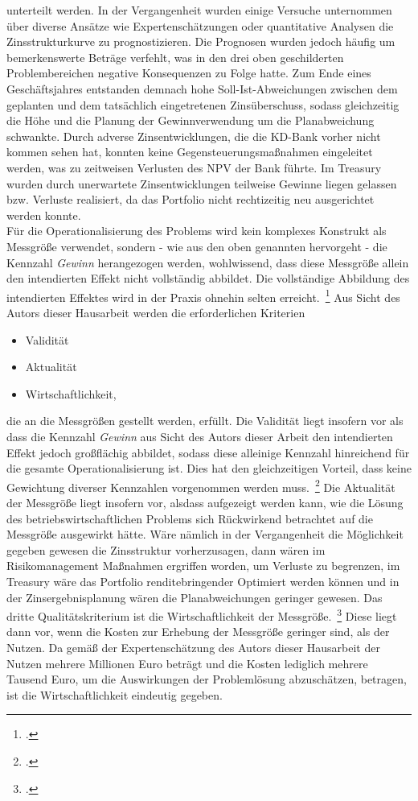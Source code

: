 unterteilt werden.
In der Vergangenheit wurden einige Versuche unternommen über diverse Ansätze wie Expertenschätzungen oder quantitative
Analysen die Zinsstrukturkurve zu prognostizieren.
Die Prognosen wurden jedoch häufig um bemerkenswerte Beträge verfehlt, was in den drei oben geschilderten Problembereichen
negative Konsequenzen zu Folge hatte.
Zum Ende eines Geschäftsjahres entstanden demnach hohe Soll-Ist-Abweichungen zwischen dem geplanten und dem tatsächlich
eingetretenen Zinsüberschuss, sodass gleichzeitig die Höhe und die Planung der Gewinnverwendung um die Planabweichung
schwankte.
Durch adverse Zinsentwicklungen, die die \ac{KD-Bank} vorher nicht kommen sehen hat, konnten keine Gegensteuerungsmaßnahmen
eingeleitet werden, was zu zeitweisen Verlusten des \ac{NPV} der Bank führte.
Im Treasury wurden durch unerwartete Zinsentwicklungen teilweise Gewinne liegen gelassen bzw. Verluste realisiert, da
das Portfolio nicht rechtizeitig neu ausgerichtet werden konnte.\\
Für die Operationalisierung des Problems wird kein komplexes Konstrukt als Messgröße verwendet, sondern - wie aus den
oben genannten hervorgeht - die Kennzahl \textit{Gewinn} herangezogen werden, wohlwissend, dass diese Messgröße allein den
intendierten Effekt nicht vollständig abbildet.
Die vollständige Abbildung des intendierten Effektes wird in der Praxis ohnehin selten erreicht.~\footcite[\vglf]
[]{seiter.2019}
Aus Sicht des Autors dieser Hausarbeit werden die erforderlichen Kriterien
\begin{itemize}
    \item Validität
    \item Aktualität
    \item Wirtschaftlichkeit,
\end{itemize}
die an die Messgrößen gestellt werden, erfüllt.
Die Validität liegt insofern vor als dass die Kennzahl \textit{Gewinn} aus Sicht des Autors dieser Arbeit den
intendierten Effekt jedoch großflächig abbildet, sodass diese alleinige Kennzahl hinreichend für die gesamte
Operationalisierung ist.
Dies hat den gleichzeitigen Vorteil, dass keine Gewichtung diverser Kennzahlen vorgenommen werden muss.~\footcite[\vglf]
[]{seiter.2019}
Die Aktualität der Messgröße liegt insofern vor, alsdass aufgezeigt werden kann, wie die Lösung des betriebswirtschaftlichen
Problems sich Rückwirkend betrachtet auf die Messgröße ausgewirkt hätte.
Wäre nämlich in der Vergangenheit die Möglichkeit gegeben gewesen die Zinsstruktur vorherzusagen, dann wären im
Risikomanagement Maßnahmen ergriffen worden, um Verluste zu begrenzen, im Treasury wäre das Portfolio renditebringender
Optimiert werden können und in der Zinsergebnisplanung wären die Planabweichungen geringer gewesen.
Das dritte Qualitätskriterium ist die Wirtschaftlichkeit der Messgröße.~\footcite[\vglf][]{seiter.2019}
Diese liegt dann vor, wenn die Kosten zur Erhebung der Messgröße geringer sind, als der Nutzen.
Da gemäß der Expertenschätzung des Autors dieser Hausarbeit der Nutzen mehrere Millionen Euro beträgt und die Kosten
lediglich mehrere Tausend Euro, um die Auswirkungen der Problemlösung abzuschätzen, betragen, ist die Wirtschaftlichkeit
eindeutig gegeben.\\

